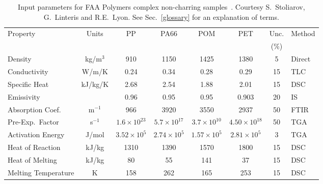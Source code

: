 \begin{table}[h!]
\caption[FAA complex non-charring polymer properties]{Input parameters for FAA Polymers complex non-charring samples~\cite{Stoliarov:FM2012}. Courtesy S.~Stoliarov, G.~Linteris and R.E.~Lyon. See Sec.~\ref{glossary} for an explanation of terms.}
\begin{center}
\begin{tabular}{|l|c|c|c|c|c|c|l|}
\hline
Property                    & Units         & PP                    & PA66                  & POM                   & PET                   & Unc.      & Method    \\
                            &               &                       &                       &                       &                       & (\%)      &           \\ \hline \hline
Density                     & kg/m$^3$      & 910                   & 1150                  & 1425                  & 1380                  & 5         & Direct    \\ \hline
Conductivity                & W/m/K         & 0.24                  & 0.34                  & 0.28                  & 0.29                  & 15        & TLC       \\ \hline
Specific Heat               & kJ/kg/K       & 2.68                  & 2.54                  & 1.88                  & 2.01                  & 15        & DSC       \\ \hline
Emissivity                  &               & 0.96                  & 0.95                  & 0.95                  & 0.903                 & 20        & IS        \\ \hline
Absorption Coef.            & m$^{-1}$      & 966                   & 3920                  & 3550                  & 2937                  & 50        & FTIR      \\ \hline
Pre-Exp.~Factor             & s$^{-1}$      & $1.6 \times 10^{23}$  & $5.7 \times 10^{17}$  & $3.7 \times 10^{10}$  & $4.50 \times 10^{18}$ & 50        & TGA       \\ \hline
Activation Energy           & J/mol       & $3.52 \times 10^{5}$  & $2.74 \times 10^{5}$  & $1.57 \times 10^{5}$  & $2.81 \times 10^{5}$  & 3         & TGA       \\ \hline
Heat of Reaction            & kJ/kg         & 1310                  & 1390                  & 1570                  & 1800                  & 15        & DSC       \\ \hline
Heat of Melting             & kJ/kg         & 80                    & 55                    & 141                   & 37                    & 15        & DSC       \\ \hline
Melting Temperature         & K             & 158                   & 262                   & 165                   & 253                   & 15        & DSC       \\ \hline

\end{tabular}
\end{center}
\label{FAA_Properties2}
\end{table}



